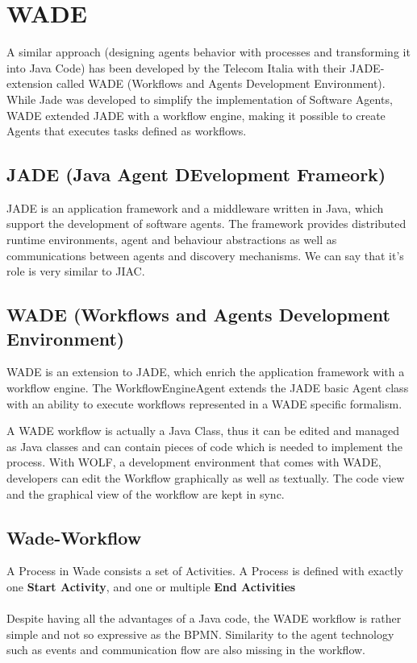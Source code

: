 \section{WADE}
A similar approach (designing agents behavior with processes and transforming it into Java Code) has been developed by the Telecom Italia with their JADE-extension called WADE (Workflows and Agents Development Environment). While Jade was developed to simplify the implementation of Software Agents, WADE extended JADE with a workflow engine, making it possible to create Agents that executes tasks defined as workflows.

\subsection{JADE (\textbf{J}ava \textbf{A}gent \textbf{DE}velopment Frameork)}
JADE is an application framework and a middleware written in Java, which support the development of software agents. The framework  provides distributed runtime environments, agent and behaviour abstractions as well as communications between agents and discovery mechanisms. We can say that it's role is very similar to JIAC.

\subsection{WADE (Workflows and Agents Development Environment)}
WADE is an extension to JADE, which enrich the application framework with a workflow engine. The WorkflowEngineAgent extends the JADE basic Agent class with an ability to execute workflows represented in a WADE specific formalism.

A WADE workflow is actually a Java Class, thus it can be edited and managed as Java classes and can contain pieces of code which is needed to implement the process. With WOLF, a development environment that comes with WADE, developers can edit the Workflow graphically as well as textually. The code view and the graphical view of the workflow are kept in sync. 


\subsection{Wade-Workflow}
A Process in Wade consists a set of Activities. A Process is defined with exactly one \textbf{Start Activity}, and one or multiple \textbf{End Activities} 
\\\\
Despite having all the advantages of a Java code, the WADE workflow is rather simple and not so expressive as the BPMN. Similarity to the agent technology such as events and communication flow are also missing in the workflow. 